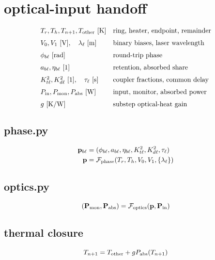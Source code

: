 \documentclass[11pt]{article}
\begin{document}
\section*{optical-input handoff}
\[
\begin{array}{ll}T_r,T_h,T_{n+1},T_{\rm other}\ [\mathrm K]&\text{ring, heater, endpoint, remainder}\\[0.6em]V_0,V_1\ [\mathrm V],\quad\lambda_\ell\ [\mathrm m]&\text{binary biases, laser wavelength}\\[0.6em]\phi_{b\ell}\ [\mathrm{rad}]&\text{round-trip phase}\\[0.6em]a_{b\ell},\eta_{b\ell}\ [1]&\text{retention, absorbed share}\\[0.6em]K_{t\ell}^2,K_{d\ell}^2\ [1],\quad\tau_\ell\ [\mathrm s]&\text{coupler fractions, common delay}\\[0.6em]P_{\rm in},P_{\rm mon},P_{\rm abs}\ [\mathrm W]&\text{input, monitor, absorbed power}\\[0.6em]g\ [\mathrm{K/W}]&\text{substep optical-heat gain}\end{array}
\]
\subsection*{phase.py}
\[
\displaystyle \begin{aligned}\mathbf p_{b\ell}&=(\phi_{b\ell},a_{b\ell},\eta_{b\ell},K_{t\ell}^2,K_{d\ell}^2,\tau_\ell)\\\mathbf p&=\mathcal F_{\rm phase}(T_r,T_h,V_0,V_1,\{\lambda_\ell\})\end{aligned}
\]
\subsection*{optics.py}
\[
\displaystyle (\mathbf P_{\rm mon},\mathbf P_{\rm abs})=\mathcal F_{\rm optics}(\mathbf p,\mathbf P_{\rm in})
\]
\subsection*{thermal closure}
\[
\displaystyle T_{n+1}=T_{\rm other}+gP_{\rm abs}(T_{n+1})
\]
\end{document}
